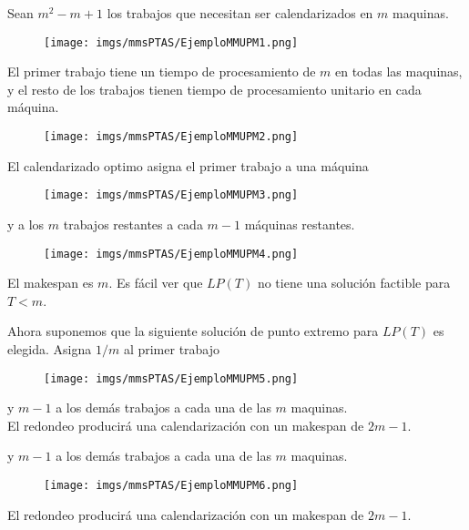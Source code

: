 \begin{frame}{\subsectiontitle}
Sean $m^2-m+1$ los trabajos que necesitan ser calendarizados en $m$ maquinas.
\begin{figure}
    \centering
    \texttt{[image: imgs/mmsPTAS/EjemploMMUPM1.png]}
\end{figure}
\end{frame}

\begin{frame}{\subsectiontitle}
El primer trabajo tiene un tiempo de procesamiento de $m$ en todas las maquinas, y el resto de los trabajos tienen tiempo de procesamiento unitario en cada máquina.
\begin{figure}
    \centering
    \texttt{[image: imgs/mmsPTAS/EjemploMMUPM2.png]}
\end{figure}
\end{frame}

\begin{frame}{\subsectiontitle}
El calendarizado optimo asigna el primer trabajo a una máquina
\begin{figure}
    \centering
    \texttt{[image: imgs/mmsPTAS/EjemploMMUPM3.png]}
\end{figure}
\end{frame}

\begin{frame}{\subsectiontitle}
y a los $m$ trabajos restantes a cada $m-1$ máquinas restantes.
\begin{figure}
    \centering
    \texttt{[image: imgs/mmsPTAS/EjemploMMUPM4.png]}
\end{figure}
 El makespan es $m$. Es fácil ver que $LP(T)$ no tiene una solución factible para $T<m$.
\end{frame}

\begin{frame}{\subsectiontitle}
Ahora suponemos que la siguiente solución de punto extremo para $LP(T)$ es elegida. Asigna $1/m$ al primer trabajo
\begin{figure}
    \centering
    \texttt{[image: imgs/mmsPTAS/EjemploMMUPM5.png]}
\end{figure} y $m-1$ a los demás trabajos a cada una de las $m$ maquinas.\\

El redondeo producirá una calendarización con un makespan de $2m-1$.
\end{frame}


\begin{frame}{\subsectiontitle}
y $m-1$ a los demás trabajos a cada una de las $m$ maquinas.
\begin{figure}
    \centering
    \texttt{[image: imgs/mmsPTAS/EjemploMMUPM6.png]}
\end{figure} 
El redondeo producirá una calendarización con un makespan de $2m-1$.
\end{frame}